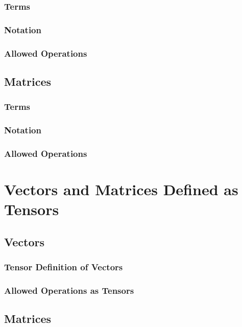 \documentclass[12pt]{article}
\begin{document}
\subsubsection{Terms}

\subsubsection{Notation}

\subsubsection{Allowed Operations}


\subsection{Matrices}

\subsubsection{Terms}

\subsubsection{Notation}

\subsubsection{Allowed Operations}


\section{Vectors and Matrices Defined as Tensors}\label{Sec:VecMatAsTensors}

\subsection{Vectors}

\subsubsection{Tensor Definition of Vectors}

\subsubsection{Allowed Operations as Tensors}

\subsection{Matrices}
\end{document}
